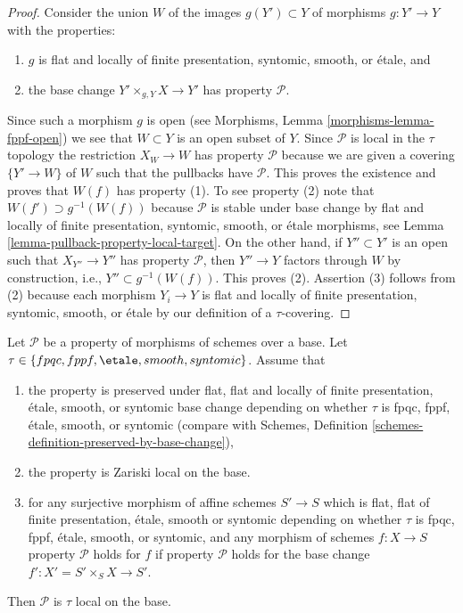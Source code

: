 \begin{proof}
Consider the union $W$ of the images $g(Y') \subset Y$ of
morphisms $g : Y' \to Y$ with the properties:
\begin{enumerate}
\item $g$ is flat and locally of finite presentation, syntomic,
smooth, or \'etale, and
\item the base change $Y' \times_{g, Y} X \to Y'$ has property
$\mathcal{P}$.
\end{enumerate}
Since such a morphism $g$ is open (see
Morphisms, Lemma \ref{morphisms-lemma-fppf-open})
we see that $W \subset Y$ is an open subset of $Y$. Since $\mathcal{P}$
is local in the $\tau$ topology the restriction $X_W \to W$ has property
$\mathcal{P}$ because we are given a covering $\{Y' \to W\}$ of $W$ such that
the pullbacks have $\mathcal{P}$. This proves the existence and proves
that $W(f)$ has property (1). To see property (2) note that
$W(f') \supset g^{-1}(W(f))$ because $\mathcal{P}$ is stable under
base change by flat and locally of finite presentation,
syntomic, smooth, or \'etale morphisms, see
Lemma \ref{lemma-pullback-property-local-target}.
On the other hand, if $Y'' \subset Y'$ is an open such that
$X_{Y''} \to Y''$ has property $\mathcal{P}$, then $Y'' \to Y$ factors
through $W$ by construction, i.e., $Y'' \subset g^{-1}(W(f))$. This
proves (2). Assertion (3) follows from (2) because each morphism
$Y_i \to Y$ is flat and locally of finite presentation, syntomic,
smooth, or \'etale by our definition of a $\tau$-covering.
\end{proof}

\begin{lemma}
\label{lemma-descending-properties-morphisms}
Let $\mathcal{P}$ be a property of morphisms of schemes over a base.
Let $\tau \in \{fpqc, fppf, \etale, smooth, syntomic\}$.
Assume that
\begin{enumerate}
\item the property is preserved under
flat, flat and locally of finite presentation, \'etale, smooth, or syntomic
base change depending on whether $\tau$ is fpqc, fppf, \'etale, smooth, or
syntomic (compare with
Schemes, Definition \ref{schemes-definition-preserved-by-base-change}),
\item the property is Zariski local on the base.
\item for any surjective morphism of affine schemes $S' \to S$
which is flat, flat of finite presentation,
\'etale, smooth or syntomic depending on whether $\tau$ is
fpqc, fppf, \'etale, smooth, or syntomic,
and any morphism of schemes $f : X \to S$ property
$\mathcal{P}$ holds for $f$ if property $\mathcal{P}$
holds for the base change $f' : X' = S' \times_S X \to S'$.
\end{enumerate}
Then $\mathcal{P}$ is $\tau$ local on the base.
\end{lemma}

